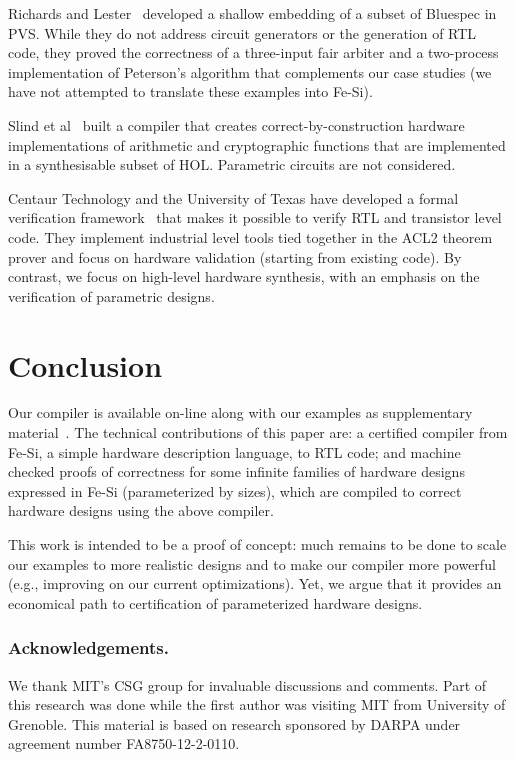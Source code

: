 \documentclass{llncs}
\begin{document}
\medskip

Richards and Lester~\cite{DBLP:journals/isse/RichardsL11} developed a
shallow embedding of a subset of Bluespec in PVS. While they do not
address circuit generators or the generation of RTL code, they proved
the correctness of a three-input fair arbiter and a two-process
implementation of Peterson's algorithm that complements our case
studies (we have not attempted to translate these examples into Fe-Si).

Slind et al~\cite{DBLP:journals/fac/SlindOIG07} built a compiler that
creates correct-by-construction hardware implementations of arithmetic
and cryptographic functions that are implemented in a synthesisable
subset of HOL. Parametric circuits are not considered. 

Centaur Technology and the University of Texas have developed a formal
verification framework~\cite{DBLP:conf/memocode/SlobodovaDSH11} that
makes it possible to verify RTL and transistor level code. 
%
They implement industrial level tools tied together in the ACL2
theorem prover and focus on hardware validation (starting from
existing code). By contrast, we focus on high-level hardware
synthesis, with an emphasis on the verification of parametric designs.

\section{Conclusion}
Our compiler is available on-line along with our examples as
supplementary material~\cite{fesi}.
%
The technical contributions of this paper are: 
%
a certified compiler from Fe-Si, a simple hardware description
language, to RTL code;
%
and machine checked proofs of correctness for some infinite families
of hardware designs expressed in Fe-Si (parameterized by sizes), which
are compiled to correct hardware designs using the above compiler.

This work is intended to be a proof of concept: much remains to be
done to scale our examples to more realistic designs and to make our
compiler more powerful (e.g., improving on our current
optimizations). Yet, we argue that it provides an economical path to
certification of parameterized hardware designs.

\subsubsection{Acknowledgements.} We thank MIT's CSG group for
invaluable discussions and comments. 
%
Part of this research was done while the first author was visiting MIT
from University of Grenoble. This material is based on research
sponsored by DARPA under agreement number FA8750-12-2-0110.



\end{document}
